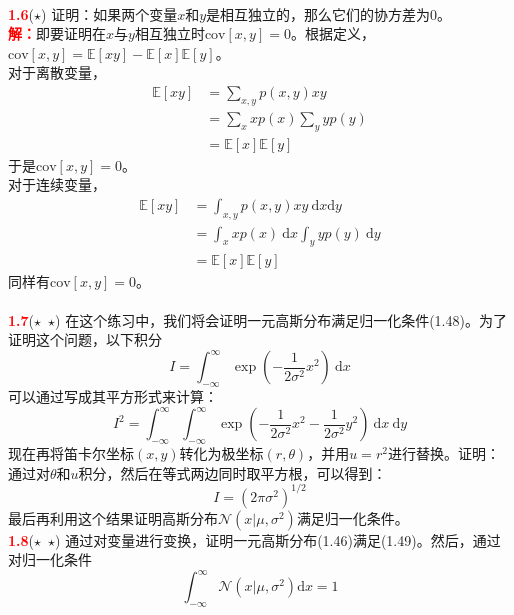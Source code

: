 \documentclass{book}
\numberwithin{equation}{chapter}
\newcommand {\solution} {\textcolor{red}{\textbf{解：}}}
\begin{document}
{	\\
	\textcolor{red}{\textbf{1.6}}\quad ($\star$) 证明：如果两个变量$x$和$y$是相互独立的，那么它们的协方差为0。\\
	\solution 即要证明在$x$与$y$相互独立时$\mathrm{cov}[x,y]=0$。根据定义，$\mathrm{cov}[x,y]=\mathbb{E}[xy]-\mathbb{E}[x]\mathbb{E}[y]$。\\
	\indent 对于离散变量，
	\[
	\begin{split}
		\mathbb{E}[xy]&=\sum_{x,y}p(x,y)xy\\
		&=\sum_{x}xp(x)\sum_yyp(y)\\
		&=\mathbb{E}[x]\mathbb{E}[y]
	\end{split}
	\]
	\indent 于是$\mathrm{cov}[x,y]=0$。\\
	\indent 对于连续变量，
	\[
	\begin{split}
		\mathbb{E}[xy]&=\int_{x,y}p(x,y)xy \ \mathrm{d}x \mathrm{d}y\\
		&=\int_{x}xp(x)\ \mathrm{d}x\int_yyp(y)\ \mathrm{d}y\\
		&=\mathbb{E}[x]\mathbb{E}[y]
	\end{split}
	\]
	\indent 同样有$\mathrm{cov}[x,y]=0$。\\
	\\
	\textcolor{red}{\textbf{1.7}}\quad ($\star$\ $\star$) 在这个练习中，我们将会证明一元高斯分布满足归一化条件(1.48)。为了证明这个问题，以下积分
	\begin{equation}
		I = \int_{-\infty}^{\infty}\exp{\left(-\frac{1}{2\sigma^2}x^2\right)}\ \mathrm{d}x
	\end{equation}
	可以通过写成其平方形式来计算：
	\begin{equation}
		I^2 = \int_{-\infty}^{\infty} \int_{-\infty}^{\infty} \exp\left(-\frac{1}{2\sigma^2}x^2-\frac{1}{2\sigma^2}y^2\right) \ \mathrm{d}x\ \mathrm{d}y
	\end{equation}
	现在再将笛卡尔坐标$(x,y)$转化为极坐标$(r,\theta)$，并用$u=r^2$进行替换。证明：通过对$\theta$和$u$积分，然后在等式两边同时取平方根，可以得到：
	\begin{equation}
		I = (2\pi \sigma^2)^{1/2}
	\end{equation}
	最后再利用这个结果证明高斯分布$\mathcal{N}(x|\mu,\sigma^2)$满足归一化条件。\\
	\textcolor{red}{\textbf{1.8}}\quad ($\star$\ $\star$) 通过对变量进行变换，证明一元高斯分布(1.46)满足(1.49)。然后，通过对归一化条件
	\begin{equation}
		\int_{-\infty}^{\infty}\mathcal{N}(x|\mu,\sigma^2) \mathrm{d}x =1
	\end{equation}
}
\end{document}
